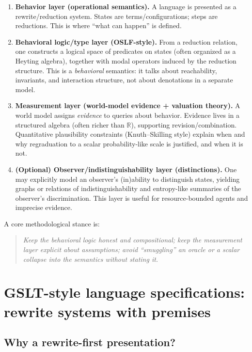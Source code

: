 \documentclass[11pt]{article}
\theoremstyle{definition}
\begin{document}
\begin{enumerate}[leftmargin=1.5em]
\item \textbf{Behavior layer (operational semantics).}
A language is presented as a rewrite/reduction system.
States are terms/configurations; steps are reductions.
This is where ``what can happen'' is defined.

\item \textbf{Behavioral logic/type layer (OSLF-style).}
From a reduction relation, one constructs a logical space of predicates on states
(often organized as a Heyting algebra), together with modal operators induced by the reduction structure.
This is a \emph{behavioral} semantics: it talks about reachability, invariants, and interaction structure,
not about denotations in a separate model.

\item \textbf{Measurement layer (world-model evidence + valuation theory).}
A world model assigns \emph{evidence} to queries about behavior.
Evidence lives in a structured algebra (often richer than $\mathbb{R}$), supporting revision/combination.
Quantitative plausibility constraints (Knuth--Skilling style) explain when and why
regraduation to a scalar probability-like scale is justified, and when it is not.

\item \textbf{(Optional) Observer/indistinguishability layer (distinctions).}
One may explicitly model an observer's (in)ability to distinguish states, yielding
graphs or relations of indistinguishability and entropy-like summaries of the observer's discrimination.
This layer is useful for resource-bounded agents and imprecise evidence.
\end{enumerate}

A core methodological stance is:
\begin{quote}
\emph{Keep the behavioral logic honest and compositional;
keep the measurement layer explicit about assumptions;
avoid ``smuggling'' an oracle or a scalar collapse into the semantics without stating it.}
\end{quote}

\section{GSLT-style language specifications: rewrite systems with premises}

\subsection{Why a rewrite-first presentation?}
\end{document}
